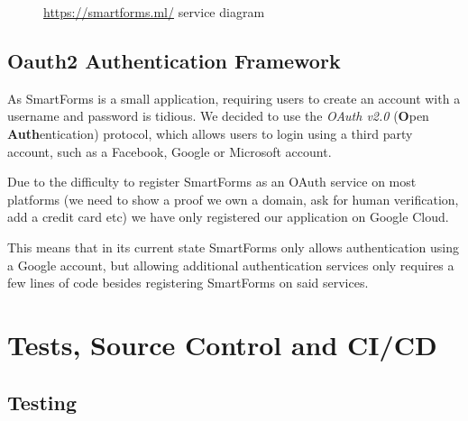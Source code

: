\documentclass[11pt, a4paper]{report}
\begin{document}
\begin{figure}[!h]
	\centering
	\caption{\url{https://smartforms.ml/} service diagram}
	\label{smartformsml-diagram}
\end{figure}


\section{Oauth2 Authentication Framework}

As SmartForms is a small application, requiring users to create an account with a username and password is tidious. We decided to use the \textit{OAuth v2.0} \cite{oauth2} (\textbf{O}pen \textbf{Auth}entication) protocol, which allows users to login using a third party account, such as a Facebook, Google or Microsoft account.

Due to the difficulty to register SmartForms as an OAuth service on most platforms (we need to show a proof we own a domain, ask for human verification, add a credit card etc) we have only registered our application on Google Cloud.

This means that in its current state SmartForms only allows authentication using a Google account, but allowing additional authentication services only requires a few lines of code besides registering SmartForms on said services.


\chapter{Tests, Source Control and CI/CD}
\label{chapter-tests-source-control}

\section{Testing}
\end{document}
